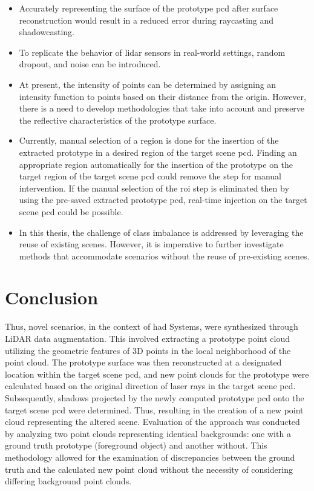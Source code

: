 \begin{itemize}
    \item Accurately representing the surface of the prototype \acrshort{pcd} after surface reconstruction would result in a reduced error during raycasting and shadowcasting.
    \item To replicate the behavior of lidar sensors in real-world settings, random dropout, and noise can be introduced.
    \item At present, the intensity of points can be determined by assigning an intensity function to points based on their distance from the origin. However, there is a need to develop methodologies that take into account and preserve the reflective characteristics of the prototype surface.
    \item Currently, manual selection of a region is done for the insertion of the extracted prototype in a desired region of the target scene \acrshort{pcd}. Finding an appropriate region automatically for the insertion of the prototype on the target region of the target scene \acrshort{pcd} could remove the step for manual intervention. If the manual selection of the \acrshort{roi} step is eliminated then by using the pre-saved extracted prototype \acrshort{pcd}, real-time injection on the target scene \acrshort{pcd} could be possible.
    \item In this thesis, the challenge of class imbalance is addressed by leveraging the reuse of existing scenes. However, it is imperative to further investigate methods that accommodate scenarios without the reuse of pre-existing scenes.
\end{itemize}

\section{Conclusion}
Thus, novel scenarios, in the context of \acrfull{had} Systems, were synthesized through LiDAR data augmentation. This involved extracting a prototype point cloud utilizing the geometric features of 3D points in the local neighborhood of the point cloud. The prototype surface was then reconstructed at a designated location within the target scene \acrshort{pcd}, and new point clouds for the prototype were calculated based on the original direction of laser rays in the target scene \acrshort{pcd}. Subsequently, shadows projected by the newly computed prototype \acrshort{pcd} onto the target scene \acrshort{pcd} were determined. Thus, resulting in the creation of a new point cloud representing the altered scene. Evaluation of the approach was conducted by analyzing two point clouds representing identical backgrounds: one with a ground truth prototype (foreground object) and another without. This methodology allowed for the examination of discrepancies between the ground truth and the calculated new point cloud without the necessity of considering differing background point clouds. 

